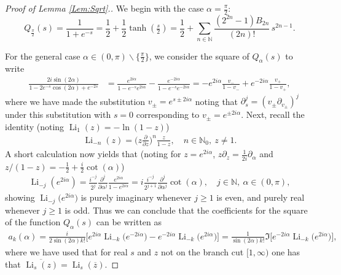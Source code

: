 \documentclass[10pt,a4paper]{amsart}
\DeclareMathOperator{\Li}{Li}
\begin{document}
\begin{proof}[Proof of Lemma \ref{Lem:Sqrt}.]
We begin with the case $\alpha=\tfrac{\pi}{2}$:
\begin{equation}
Q_{\tfrac{\pi}{2}}(s)=\frac{1}{1+e^{-s}}=\frac{1}{2}+\frac{1}{2}\tanh(\tfrac{s}{2})=\frac{1}{2}+\sum_{n\in\mathbb{N}}
\frac{(2^{2n}-1)B_{2n}}{(2n)!}\, s^{2n-1}.
\end{equation}


For the general case $\alpha\in(0,\pi)\backslash\{\tfrac{\pi}{2}\}$, we consider the square of $Q_\alpha(s)$ to write
\begin{align}
\label{eq:2.49}
\frac{2i\sin(2\alpha)}{1-2e^{-s}\cos(2\alpha)+e^{-2s}}&=\frac{e^{2i\alpha}}{1-e^{-s}e^{2i\alpha}}-\frac{e^{-2i\alpha}}{1-e^{-s}e^{-2i\alpha}}=-e^{2i\alpha}\frac{v_-}{1-v_-}+e^{-2i\alpha}\frac{v_+}{1-v_+},
\end{align}
where we have made the substitution $v_\pm=e^{s\pm 2i\alpha}$ noting that $\partial_s^{j}=(v_\pm\partial_{v_\pm} )^{j}$ under this substitution with $s=0$ corresponding to $v_\pm=e^{\pm 2i\alpha}$. Next, recall the identity (noting $\Li_1(z)=-\ln(1-z)$)
\begin{align}\label{Eq:Polylogrec}
\Li_{-n}(z)=\bigg(z\frac{\partial}{\partial z}\bigg)^n \frac{z}{1-z},\quad n\in\mathbb{N}_0,\ z\neq 1.
\end{align}
A short calculation now yields that (noting for $z=e^{2i\alpha}$, $z\partial_z=\frac{1}{2i}\partial_\alpha$ and $z/(1-z)=-\frac{1}{2}+\frac{i}{2}\cot(\alpha)$)
\begin{align}\label{Eq:Polylogid}
\Li_{-j}(e^{2i\alpha})=\frac{i^{-j}}{2^{j}}\frac{\partial^{j}}{\partial\alpha^{j}}\frac{e^{2i\alpha}}{1-e^{2i\alpha}}=i\frac{i^{-j}}{2^{j+1}}\frac{\partial^{j}}{\partial\alpha^{j}}\cot(\alpha),\quad j\in\mathbb{N},\ \alpha\in(0,\pi),
\end{align}
showing $\Li_{-j}\big(e^{2i\alpha}\big)$ is purely imaginary whenever $j\geq1$ is even, and purely real whenever $j\geq1$ is odd.
Thus we can conclude that the coefficients for the square of the function $Q_\alpha(s)$ can be written as
\begin{align}\label{Eq:akmid}
a_k(\alpha)=\frac{i}{2\sin(2\alpha) k!}\big[e^{2i\alpha}\Li_{-k}\big(e^{-2i\alpha}\big)-e^{-2i\alpha}\Li_{-k}\big(e^{2i\alpha}\big)\big]=\frac{1}{\sin(2\alpha) k!}\Im\big[e^{-2i\alpha}\Li_{-k}\big(e^{2i\alpha}\big)\big],
\end{align}
where we have used that for real $s$ and $z$ not on the branch cut $[1,\infty)$ one has that $\overline{\Li_s(z)}=\Li_s(\overline{z})$.

\end{proof}
\end{document}
